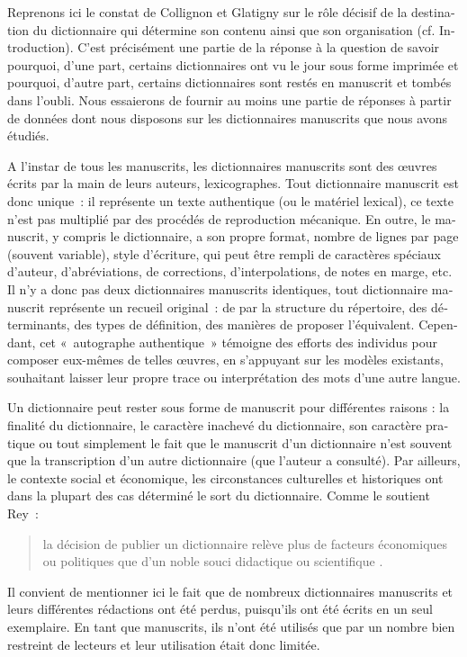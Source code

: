 \documentclass[output=paper,colorlinks,citecolor=brown,arabicfont,chinesefont,booklanguage=french]{langscibook}
\begin{document}
\begin{otherlanguage}{french}
Reprenons ici le constat de Collignon et Glatigny sur le rôle décisif de la destination du dictionnaire qui détermine son contenu ainsi que son organisation (cf. Introduction). C’est précisément une partie de la réponse à la question de savoir pourquoi, d’une part, certains dictionnaires ont vu le jour sous forme imprimée et pourquoi, d’autre part, certains dictionnaires sont restés en manuscrit et tombés dans l’oubli. Nous essaierons de fournir au moins une partie de réponses à partir de données dont nous disposons sur les dictionnaires manuscrits que nous avons étudiés.

A l’instar de tous les manuscrits, les dictionnaires manuscrits sont des œuvres écrits par la main de leurs auteurs, lexicographes. Tout dictionnaire manuscrit est donc unique~: il représente un texte authentique (ou le matériel lexical), ce texte n’est pas multiplié par des procédés de reproduction mécanique. En outre, le manuscrit, y compris le dictionnaire, a son propre format, nombre de lignes par page (souvent variable), style d’écriture, qui peut être rempli de caractères spéciaux d’auteur, d’abréviations, de corrections, d’interpolations, de notes en marge, etc. Il n’y a donc pas deux dictionnaires manuscrits identiques, tout dictionnaire manuscrit représente un recueil original~: de par la structure du répertoire, des déterminants, des types de définition, des manières de proposer l’équivalent. Cependant, cet «~autographe authentique~» témoigne des efforts des individus pour composer eux-mêmes de telles œuvres, en s’appuyant sur les modèles existants, souhaitant laisser leur propre trace ou interprétation des mots d’une autre langue.

Un dictionnaire peut rester sous forme de manuscrit pour différentes raisons : la finalité du dictionnaire, le caractère inachevé du dictionnaire, son caractère pratique ou tout simplement le fait que le manuscrit d’un dictionnaire n’est souvent que la transcription d’un autre dictionnaire (que l’auteur a consulté). Par ailleurs, le contexte social et économique, les circonstances culturelles et historiques ont dans la plupart des cas déterminé le sort du dictionnaire. Comme le soutient Rey~:

\begin{quote}
    la décision de publier un dictionnaire relève plus de facteurs économiques ou politiques que d’un noble souci didactique ou scientifique \citet[14]{Rey2008}.
\end{quote}

Il convient de mentionner ici le fait que de nombreux dictionnaires manuscrits et leurs différentes rédactions ont été perdus, puisqu’ils ont été écrits en un seul exemplaire. En tant que manuscrits, ils n’ont été utilisés que par un nombre bien restreint de lecteurs et leur utilisation était donc limitée.


\end{otherlanguage}
\end{document}
